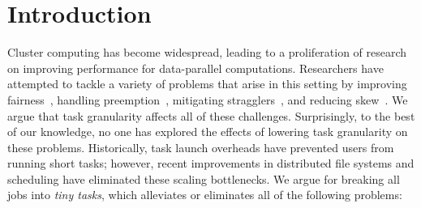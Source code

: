 \section{Introduction}
Cluster computing has become widespread, leading to a proliferation of
research on improving performance for data-parallel computations. 
Researchers have attempted
to tackle a variety of problems that arise in this setting by improving
fairness~\cite{zaharia2008improving,hindman2011mesos},
handling preemption~\cite{ananthanarayanan2012true,isard2009quincy},
mitigating stragglers~\cite{ananthanarayanan2010reining,ananthanarayanan2012why},
and reducing skew~\cite{ananthanarayanan2011scarlett,kwon2012skewtune,gufler2012load}.
We argue that task granularity affects all of these challenges. Surprisingly,
to the best of our knowledge, no one has explored the effects of lowering
task granularity on these problems.
Historically, task launch overheads have prevented users from running
short tasks; however, recent improvements in distributed file systems and
scheduling have eliminated these scaling bottlenecks.
We argue for
breaking all jobs into \emph{tiny tasks}, which alleviates or eliminates
all of the following problems:

